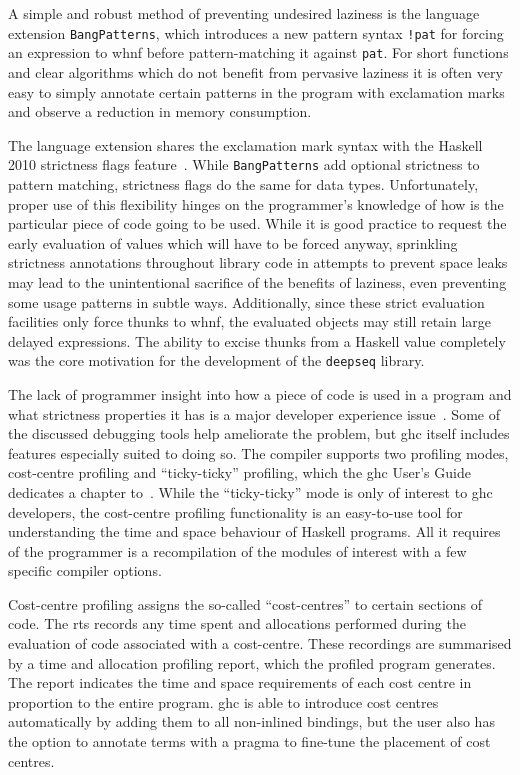 \documentclass[thesis=B,english]{FITthesis}[2019/12/23]
\newcommand{\hackage}[1]{\texttt{#1}}
\newcommand{\hsPat}[1]{\texttt{#1}}
\begin{document}
A simple and robust method of preventing undesired laziness is the
language extension \texttt{BangPatterns}, which introduces a new pattern syntax
\hsPat{!pat} for forcing an expression to \acrshort{whnf} before
pattern-matching it against \hsPat{pat}. For short functions and clear
algorithms which do not benefit from pervasive laziness it is often very easy
to simply annotate certain patterns in the program with exclamation marks and
observe a reduction in memory consumption.

The language extension shares the exclamation mark syntax with the Haskell 2010
strictness flags feature~\cite{haskell2010-strictness-flags}. While
\texttt{BangPatterns} add optional strictness to pattern matching, strictness
flags do the same for data types. Unfortunately, proper use of this flexibility
hinges on the programmer's knowledge of how is the particular piece of code
going to be used. While it is good practice to request the early evaluation of
values which will have to be forced anyway, sprinkling strictness annotations
throughout library code in attempts to prevent space leaks may lead to the
unintentional sacrifice of the benefits of laziness, even preventing some usage
patterns in subtle ways. Additionally, since these strict evaluation facilities
only force thunks to \acrshort{whnf}, the evaluated objects may still retain
large delayed expressions. The ability to excise thunks from a Haskell value
completely was the core motivation for the development of the \hackage{deepseq}
library.

The lack of programmer insight into how a piece of code is used in a program
and what strictness properties it has is a major developer experience
issue~\cite{memory-profiling-blog-post, anatomy-of-thunk-leak-blog-post,
nothunks-blog-post, haskell-space-leaks, detecting-space-leaks-blog-post}.
Some of the discussed debugging tools help ameliorate the problem, but
\acrshort{ghc} itself includes features especially suited to doing so. The
compiler supports two profiling modes, cost-centre profiling and
``ticky-ticky'' profiling, which the \acrshort{ghc} User's Guide dedicates a
chapter to~\cite{ghc-profiling}. While the ``ticky-ticky'' mode is only of
interest to \acrshort{ghc} developers, the cost-centre profiling functionality
is an easy-to-use tool for understanding the time and space behaviour of
Haskell programs. All it requires of the programmer is a recompilation of the
modules of interest with a few specific compiler options.

Cost-centre profiling assigns the so-called ``cost-centres'' to certain
sections of code. The \acrshort{rts} records any time spent and allocations
performed during the evaluation of code associated with a cost-centre. These
recordings are summarised by a time and allocation profiling report, which the
profiled program generates. The report indicates the time and space
requirements of each cost centre in proportion to the entire program.
\acrshort{ghc} is able to introduce cost centres automatically by adding them
to all non-in\-lined bindings, but the user also has the option to annotate
terms with a pragma to fine-tune the placement of cost centres.
\end{document}
